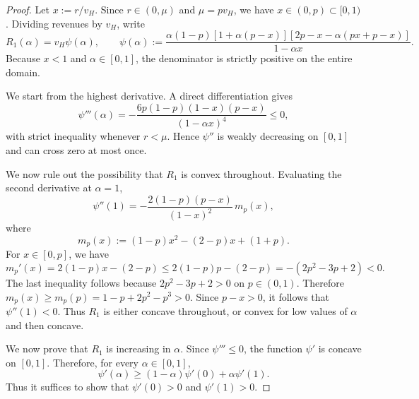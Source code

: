 \documentclass[11pt]{article}
\theoremstyle{plain}
\theoremstyle{definition}
\theoremstyle{plain}
\theoremstyle{plain}
\theoremstyle{plain}
\theoremstyle{plain}
\numberwithin{equation}{section}
\begin{document}
\begin{proof}
    Let $x := r/v_H$. Since $r \in (0,\mu)$ and $\mu = p v_H$, we have $x \in (0,p) \subset [0,1)$. Dividing revenues by $v_H$, write
\begin{equation*}
    R_1(\alpha) = v_H \psi(\alpha), \qquad \psi(\alpha) := \frac{\alpha (1-p) [1+\alpha (p-x)] [2p-x-\alpha (px+p-x)]}{1-\alpha x}.
\end{equation*}
Because $x<1$ and $\alpha \in [0,1]$, the denominator is strictly positive on the entire domain.

\vspace{2mm}

\noindent We start from the highest derivative. A direct differentiation gives
\begin{equation*}
    \psi'''(\alpha) = - \frac{6p(1-p)(1-x)(p-x)}{(1-\alpha x)^4} \leq 0,
\end{equation*}
with strict inequality whenever $r<\mu$. Hence $\psi''$ is weakly decreasing on $[0,1]$ and can cross zero at most once.

\vspace{2mm}

\noindent We now rule out the possibility that $R_1$ is convex throughout. Evaluating the second derivative at $\alpha=1$,
\begin{equation*}
    \psi''(1) = - \frac{2(1-p)(p-x)}{(1-x)^2} \, m_p(x),
\end{equation*}
where
\begin{equation*}
    m_p(x) := (1-p)x^2 - (2-p)x + (1+p).
\end{equation*}
For $x \in [0,p]$, we have
\begin{equation*}
    m_p'(x) = 2(1-p)x - (2-p) \leq 2(1-p)p - (2-p) = -\left(2p^2-3p+2\right)<0.
\end{equation*}
The last inequality follows because $2p^2-3p+2>0$ on $p \in (0,1)$.
Therefore $m_p(x) \geq m_p(p) = 1-p+2p^2-p^3>0$. Since $p-x>0$, it follows that $\psi''(1)<0$. Thus $R_1$ is either concave throughout, or convex for low values of $\alpha$ and then concave.

\vspace{2mm}

\noindent We now prove that $R_1$ is increasing in $\alpha$. Since $\psi''' \leq 0$, the function $\psi'$ is concave on $[0,1]$. Therefore, for every $\alpha \in [0,1]$,
\begin{equation*}
    \psi'(\alpha) \geq (1-\alpha)\psi'(0) + \alpha \psi'(1).
\end{equation*}
Thus it suffices to show that $\psi'(0)>0$ and $\psi'(1)>0$.


\end{proof}
\end{document}
